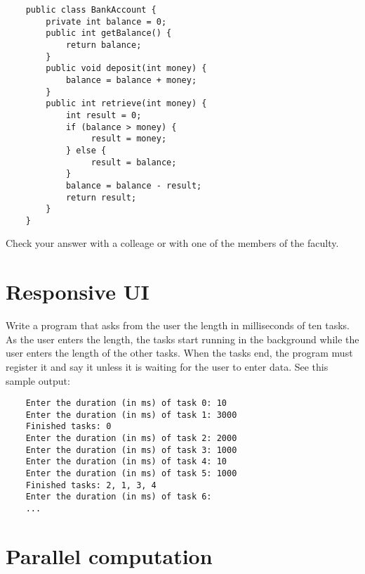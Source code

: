 \documentclass{article}
\begin{document}
\begin{verbatim}
    public class BankAccount {
        private int balance = 0;
        public int getBalance() {
            return balance;
        }
        public void deposit(int money) {
            balance = balance + money;
        }
        public int retrieve(int money) {
            int result = 0;
            if (balance > money) {
                 result = money;
            } else {
                 result = balance;
            }
            balance = balance - result;
            return result;
        }
    }
\end{verbatim}

Check your answer with a colleage or with one of the members of the
faculty. 


\section{Responsive UI}
\label{sec:responsive-ui}

Write a program that asks from the user the length in milliseconds of
ten tasks. As the user enters the length, the tasks start running in
the background while the user enters the length of the other
tasks. When the tasks end, the program must register it and say it
unless it is waiting for the user to enter data. See this sample
output: 

\begin{verbatim}
    Enter the duration (in ms) of task 0: 10
    Enter the duration (in ms) of task 1: 3000
    Finished tasks: 0
    Enter the duration (in ms) of task 2: 2000
    Enter the duration (in ms) of task 3: 1000
    Enter the duration (in ms) of task 4: 10
    Enter the duration (in ms) of task 5: 1000
    Finished tasks: 2, 1, 3, 4
    Enter the duration (in ms) of task 6: 
    ...
\end{verbatim}

\section{Parallel computation}
\label{sec:parallel-computation}
\end{document}
